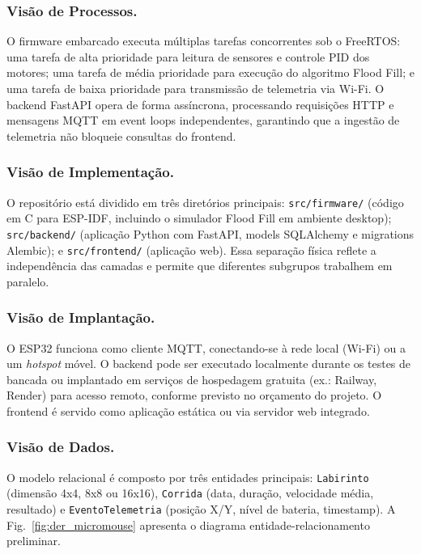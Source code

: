 \subsubsection{Visão de Processos.} O firmware embarcado executa múltiplas tarefas concorrentes sob o FreeRTOS: uma tarefa de alta prioridade para leitura de sensores e controle PID dos motores; uma tarefa de média prioridade para execução do algoritmo Flood Fill; e uma tarefa de baixa prioridade para transmissão de telemetria via Wi-Fi. O backend FastAPI opera de forma assíncrona, processando requisições HTTP e mensagens MQTT em event loops independentes, garantindo que a ingestão de telemetria não bloqueie consultas do frontend.

\subsubsection{Visão de Implementação.} O repositório está dividido em três diretórios principais: \texttt{src/firmware/} (código em C para ESP-IDF, incluindo o simulador Flood Fill em ambiente desktop); \texttt{src/backend/} (aplicação Python com FastAPI, models SQLAlchemy e migrations Alembic); e \texttt{src/frontend/} (aplicação web). Essa separação física reflete a independência das camadas e permite que diferentes subgrupos trabalhem em paralelo.

\subsubsection{Visão de Implantação.} O ESP32 funciona como cliente MQTT, conectando-se à rede local (Wi-Fi) ou a um \textit{hotspot} móvel. O backend pode ser executado localmente durante os testes de bancada ou implantado em serviços de hospedagem gratuita (ex.: Railway, Render) para acesso remoto, conforme previsto no orçamento do projeto. O frontend é servido como aplicação estática ou via servidor web integrado.

\subsubsection{Visão de Dados.} O modelo relacional é composto por três entidades principais: \texttt{Labirinto} (dimensão 4x4, 8x8 ou 16x16), \texttt{Corrida} (data, duração, velocidade média, resultado) e \texttt{EventoTelemetria} (posição X/Y, nível de bateria, timestamp). A Fig.~\ref{fig:der_micromouse} apresenta o diagrama entidade-relacionamento preliminar.

